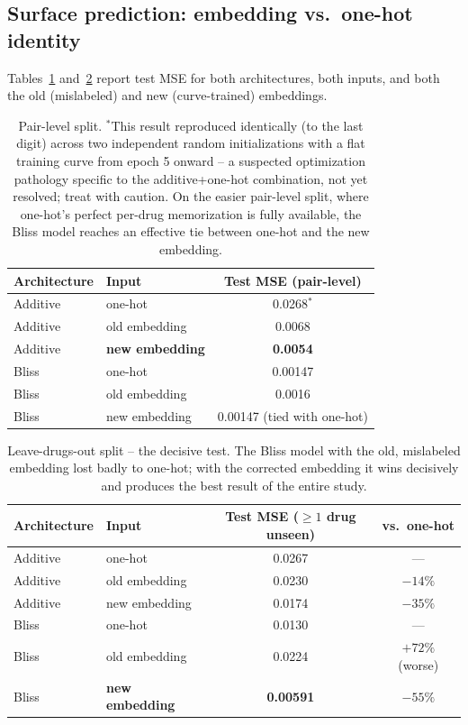 \documentclass[11pt]{article}
\begin{document}
\subsection{Surface prediction: embedding vs.\ one-hot identity}

Tables~\ref{tab:pairlevel} and~\ref{tab:ldo} report test MSE for both architectures, both inputs, and both the old (mislabeled) and new (curve-trained) embeddings.

\begin{table}[h]
\centering
\begin{tabular}{llc}
\toprule
Architecture & Input & Test MSE (pair-level) \\
\midrule
Additive & one-hot & 0.0268$^{*}$ \\
Additive & old embedding & 0.0068 \\
Additive & \textbf{new embedding} & \textbf{0.0054} \\
Bliss & one-hot & 0.00147 \\
Bliss & old embedding & 0.0016 \\
Bliss & new embedding & 0.00147 (tied with one-hot) \\
\bottomrule
\end{tabular}
\caption{Pair-level split. $^*$This result reproduced identically (to the last digit) across two independent random initializations with a flat training curve from epoch 5 onward -- a suspected optimization pathology specific to the additive+one-hot combination, not yet resolved; treat with caution. On the easier pair-level split, where one-hot's perfect per-drug memorization is fully available, the Bliss model reaches an effective tie between one-hot and the new embedding.}
\label{tab:pairlevel}
\end{table}

\begin{table}[h]
\centering
\begin{tabular}{llcc}
\toprule
Architecture & Input & Test MSE ($\geq 1$ drug unseen) & vs.\ one-hot \\
\midrule
Additive & one-hot & 0.0267 & --- \\
Additive & old embedding & 0.0230 & $-14\%$ \\
Additive & new embedding & 0.0174 & $-35\%$ \\
Bliss & one-hot & 0.0130 & --- \\
Bliss & old embedding & 0.0224 & $+72\%$ (worse) \\
Bliss & \textbf{new embedding} & \textbf{0.00591} & \textbf{$-55\%$} \\
\bottomrule
\end{tabular}
\caption{Leave-drugs-out split -- the decisive test. The Bliss model with the old, mislabeled embedding lost badly to one-hot; with the corrected embedding it wins decisively and produces the best result of the entire study.}
\label{tab:ldo}
\end{table}
\end{document}
